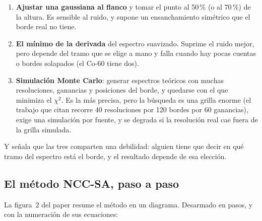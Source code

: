 \documentclass[11pt,a4paper]{article}
\begin{document}
\begin{enumerate}
\item \textbf{Ajustar una gaussiana al flanco} y tomar el punto al 50\,\% (o
      al 70\,\%) de la altura. Es sensible al ruido, y supone un
      ensanchamiento simétrico que el borde real no tiene.
\item \textbf{El mínimo de la derivada} del espectro suavizado. Suprime el
      ruido mejor, pero depende del tramo que se elige a mano y falla cuando
      hay pocas cuentas o bordes solapados (el Co-60 tiene dos).
\item \textbf{Simulación Monte Carlo}: generar espectros teóricos con muchas
      resoluciones, ganancias y posiciones del borde, y quedarse con el que
      minimiza el $\chi^2$. Es la más precisa, pero la búsqueda es una grilla
      enorme (el trabajo que citan recorre 40 resoluciones por 120 bordes por
      60 ganancias), exige una simulación por fuente, y se degrada si la
      resolución real cae fuera de la grilla simulada.
\end{enumerate}

Y señala que las tres comparten una debilidad: alguien tiene que decir en qué
tramo del espectro está el borde, y el resultado depende de esa elección.

\subsection{El método NCC-SA, paso a paso}
\label{sec:ncc-sa-paper}
\enpaper

La figura~2 del paper resume el método en un diagrama. Desarmado en pasos, y
con la numeración de sus ecuaciones:
\end{document}
